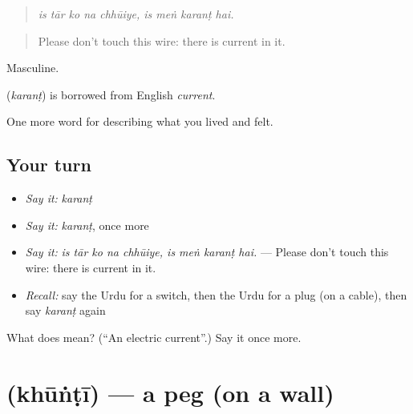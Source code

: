 \begin{quote}
        
\end{quote}

\begin{quote}
\emph{is tār ko na chhūiye, is meṅ karanṭ hai.}
\end{quote}

\begin{quote}
Please don't touch this wire: there is current in it.
\end{quote}

Masculine.

\begin{cousinweb}
\textbf{} (\emph{karanṭ}) is borrowed from English \emph{current}.
\end{cousinweb}

\begin{grammarlens}[title={What you've built}]
One more word for describing what you lived and felt.
\end{grammarlens}

\subsection*{Your turn}
\begin{itemize}
\raggedright
  \item \emph{Say it:} \emph{karanṭ}
  \item \emph{Say it:} \emph{karanṭ}, once more
  \item \emph{Say it:} \emph{is tār ko na chhūiye, is meṅ karanṭ hai.} — Please don't touch this wire: there is current in it.
  \item \emph{Recall:} say the Urdu for a switch, then the Urdu for a plug (on a cable), then say \emph{karanṭ} again
\end{itemize}

\begin{tcolorbox}[breakable,colback=teal!4,colframe=teal!35!black,title={Before you move on}]
What does  mean? (\textquotedblleft{}An electric current\textquotedblright{}.) Say it once more.
\end{tcolorbox}
\section[\texorpdfstring{\ur{کھونٹی} (khūṅṭī)}{کھونٹی (khūṅṭī)}]{ (khūṅṭī) — a peg (on a wall)}

\label{lesson:UR-C504-khunti}




